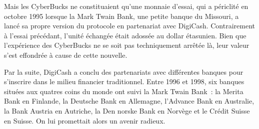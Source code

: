 Mais les CyberBucks ne constituaient qu'une monnaie d'essai, qui a périclité en octobre 1995 lorsque la Mark Twain Bank, une petite banque du Missouri, a lancé sa propre version du protocole en partenariat avec DigiCash. Contrairement à l'essai précédant, l'unité échangée était adossée au dollar étasunien. Bien que l'expérience des CyberBucks ne se soit pas techniquement arrêtée là, leur valeur s'est effondrée à cause de cette nouvelle. %

Par la suite, DigiCash a conclu des partenariats avec différentes banques pour s'inscrire dans le milieu financier traditionnel. Entre 1996 et 1998, six banques situées aux quatres coins du monde ont suivi la Mark Twain Bank~: la Merita Bank en Finlande, la Deutsche Bank en Allemagne, l'Advance Bank en Australie, la Bank Austria en Autriche, la Den norske Bank en Norvège et le Crédit Suisse en Suisse. On lui promettait alors un avenir radieux.

